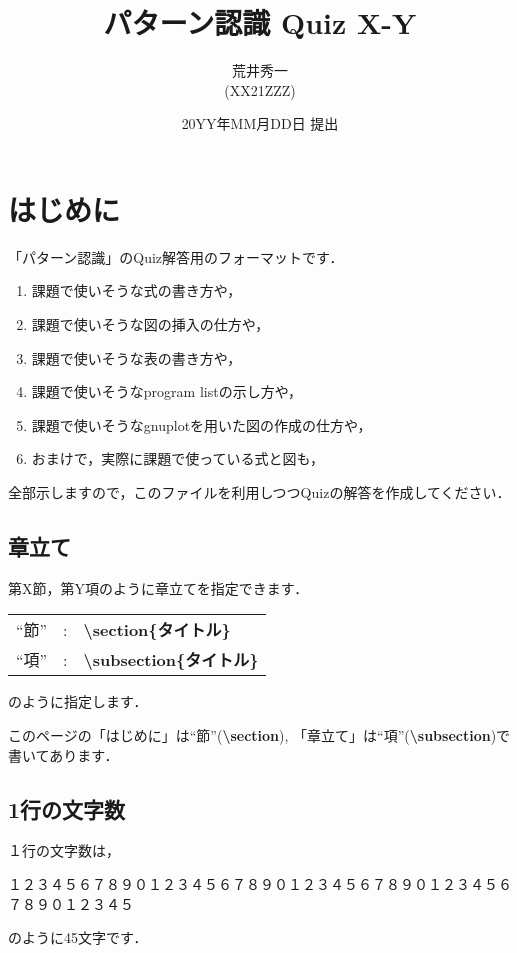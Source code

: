 \documentclass[12pt,a4j,dvipdfmx]{jarticle}
\title{パターン認識 Quiz X-Y}       %
\author{荒井秀一 \\ (XX21ZZZ)}      %
\date{20YY年MM月DD日 提出}          %
\begin{document}
\maketitle


\section{はじめに}

「パターン認識」のQuiz解答用のフォーマットです．
\begin{enumerate}
\item 課題で使いそうな式の書き方や，
\item 課題で使いそうな図の挿入の仕方や，
\item 課題で使いそうな表の書き方や，
\item 課題で使いそうなprogram listの示し方や，
\item 課題で使いそうなgnuplotを用いた図の作成の仕方や，
\item おまけで，実際に課題で使っている式と図も，
\end{enumerate}
全部示しますので，このファイルを利用しつつQuizの解答を作成してください．

\subsection{章立て}
第X節，第Y項のように章立てを指定できます．

\begin{tabular}{rcl}
``節'' & : & \bf \textbackslash  section\{タイトル\} \\
``項'' & : & \bf \textbackslash  subsection\{タイトル\} 
\end{tabular}

のように指定します．

このページの「はじめに」は``節''({\bf \textbackslash section}), 
「章立て」は``項''({\bf \textbackslash subsection})で書いてあります．

\subsection{1行の文字数}
１行の文字数は，
\begin{flushleft}
１２３４５６７８９０１２３４５６７８９０１２３４５６７８９０１２３４５６７８９０１２３４５
\end{flushleft}
のように45文字です．
\end{document}

